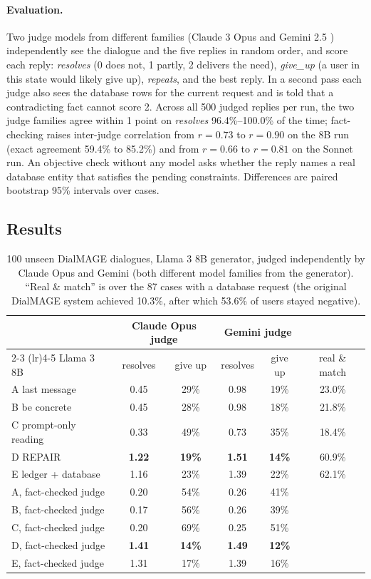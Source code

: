 \documentclass[11pt]{article}
\begin{document}
\paragraph{Evaluation.} Two judge models from different families (Claude 3 Opus and Gemini 2.5
\citep{geminiteam2024gemini}) independently see
the dialogue and the five replies in random order, and score each reply: \emph{resolves} (0 does not, 1
partly, 2 delivers the need), \emph{give\_up} (a user in this state would likely give up), \emph{repeats},
and the best reply. In a second pass each judge also sees the database rows for the current request and is
told that a contradicting fact cannot score 2. Across all 500 judged replies per run, the two judge families
agree within 1 point on \emph{resolves} 96.4\%--100.0\% of the time; fact-checking raises inter-judge
correlation from $r = 0.73$ to $r = 0.90$ on the 8B run (exact agreement 59.4\% to 85.2\%) and from $r = 0.66$
to $r = 0.81$ on the Sonnet run. An objective check without any model asks whether the reply
names a real database entity that satisfies the pending constraints. Differences are paired bootstrap 95\%
intervals over cases.

\subsection{Results}
\begin{table}[h]
\centering
\begin{tabular}{lccccc}
\toprule
 & \multicolumn{2}{c}{Claude Opus judge} & \multicolumn{2}{c}{Gemini judge} & \\
\cmidrule(lr){2-3} \cmidrule(lr){4-5}
Llama 3 8B & resolves & give up & resolves & give up & real \& match \\
\midrule
A last message & 0.45 & 29\% & 0.98 & 19\% & 23.0\% \\
B be concrete & 0.45 & 28\% & 0.98 & 18\% & 21.8\% \\
C prompt-only reading & 0.33 & 49\% & 0.73 & 35\% & 18.4\% \\
D REPAIR & \textbf{1.22} & \textbf{19\%} & \textbf{1.51} & \textbf{14\%} & 60.9\% \\
E ledger + database & 1.16 & 23\% & 1.39 & 22\% & 62.1\% \\
\midrule
A, fact-checked judge & 0.20 & 54\% & 0.26 & 41\% & \\
B, fact-checked judge & 0.17 & 56\% & 0.26 & 39\% & \\
C, fact-checked judge & 0.20 & 69\% & 0.25 & 51\% & \\
D, fact-checked judge & \textbf{1.41} & \textbf{14\%} & \textbf{1.49} & \textbf{12\%} & \\
E, fact-checked judge & 1.31 & 17\% & 1.39 & 16\% & \\
\bottomrule
\end{tabular}
\caption{100 unseen DialMAGE dialogues, Llama 3 8B generator, judged independently by Claude Opus and Gemini
(both different model families from the generator). ``Real \& match'' is over the 87 cases with a database
request (the original DialMAGE system achieved 10.3\%, after which 53.6\% of users stayed negative).}
\label{tab:llama}
\end{table}
\end{document}
